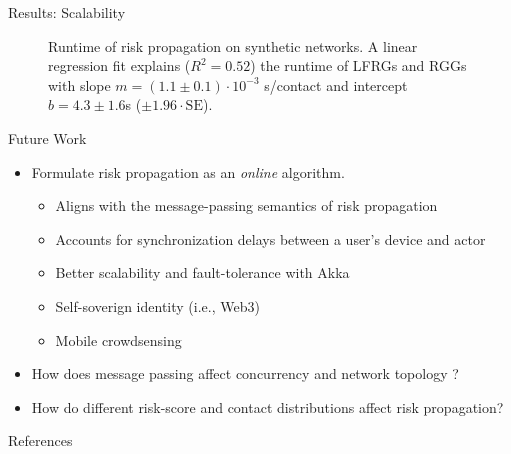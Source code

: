 \documentclass[13pt,aspectratio=169]{beamer}
\begin{document}
\begin{frame}{Results: Scalability}
\begin{figure}
\centering
{}%
\caption{Runtime of risk propagation on synthetic networks. A linear regression fit explains ($R^2 = 0.52$) the runtime of LFRGs and RGGs with slope $m = (1.1 \pm 0.1) \cdot 10^{-3}$ s/contact and intercept $b = 4.3 \pm 1.6$s ($\pm 1.96 \cdot \text{SE}$).}
\end{figure}
\end{frame}

\begin{frame}{Future Work}
\begin{itemize}
\item Formulate risk propagation as an \emph{online} algorithm.
	\begin{itemize}
	\item Aligns with the message-passing semantics of risk propagation
	\item Accounts for synchronization delays between a user's device and actor
	\item Better scalability and fault-tolerance with Akka
	\item Self-soverign identity (i.e., Web3) \cite{Preukschat2021}
	\item Mobile crowdsensing \cite{Capponi2019}
	\end{itemize}
\item How does message passing affect concurrency and network topology \cite{Masuda2021}?
\item How do different risk-score and contact distributions affect risk propagation?
\end{itemize}
\end{frame}

\begin{frame}[allowframebreaks]{References}
\scriptsize{}
\end{frame}
\end{document}
